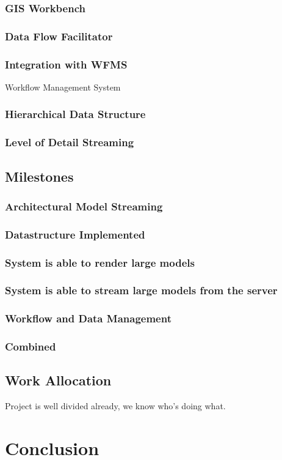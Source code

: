 \documentclass[12pt,a4paper]{article}
\begin{document}
\subsubsection{GIS Workbench}
\subsubsection{Data Flow Facilitator}
\subsubsection{Integration with WFMS}
Workflow Management System
\subsubsection{Hierarchical Data Structure}
\subsubsection{Level of Detail Streaming}
\subsection{Milestones}
\subsubsection{Architectural Model Streaming}
\subsubsection*{Datastructure Implemented}
\subsubsection*{System is able to render large models}
\subsubsection*{System is able to stream large models from the server}
\subsubsection{Workflow and Data Management}
\subsubsection{Combined}
\subsection{Work Allocation}
Project is well divided already, we know who's doing what.
\section{Conclusion}
\end{document}

